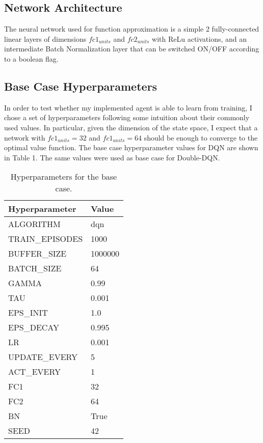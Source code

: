 \documentclass{article}
\begin{document}
\subsection{Network Architecture}

The neural network used for function approximation is a simple 2 fully-connected linear layers of dimensions $fc1_{units}$ and $fc2_{units}$ with ReLu activations, and an intermediate Batch Normalization layer that can be switched ON/OFF according to a boolean flag. 

\subsection{Base Case Hyperparameters}

In order to test whether my implemented agent is able to learn from training, I chose a set of hyperparameters following some intuition about their commonly used values. In particular, given the dimension of the state space, I expect that a network with $fc1_{units} = 32$ and $fc1_{units} = 64$ should be enough to converge to the optimal value function. The base case hyperparameter values for DQN are shown in Table 1. The same values were used as base case for Double-DQN.

\begin{table}[h!]
\centering
\begin{tabular}{ll}
\toprule
Hyperparameter &      Value \\
\midrule
           ALGORITHM &      dqn \\
 TRAIN\_EPISODES &     1000 \\
    BUFFER\_SIZE &  1000000 \\
     BATCH\_SIZE &       64 \\
          GAMMA &     0.99 \\
            TAU &    0.001 \\
       EPS\_INIT &      1.0 \\
      EPS\_DECAY &    0.995 \\
             LR &    0.001 \\
   UPDATE\_EVERY &        5 \\
      ACT\_EVERY &        1 \\
            FC1 &       32 \\
            FC2 &       64 \\
             BN &     True \\
           SEED &       42 \\
\bottomrule
\end{tabular}
\label{table:base_case}
\caption{Hyperparameters for the base case.}
\end{table}
\end{document}
